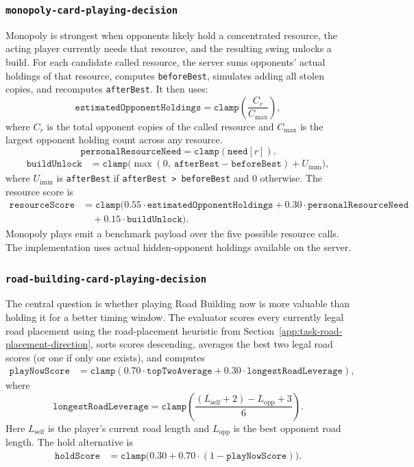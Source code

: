 \documentclass[letter,  12 pt]{article}
\begin{document}
\subsubsection{\texttt{monopoly-card-playing-decision}}
\label{app:task-monopoly-card-playing-decision}

Monopoly is strongest when opponents likely hold a concentrated resource, the acting player currently needs that resource, and the resulting swing unlocks a build.
For each candidate called resource, the server sums opponents' actual holdings of that resource, computes \texttt{beforeBest}, simulates adding all stolen copies, and recomputes \texttt{afterBest}. It then uses:
\[
\texttt{estimatedOpponentHoldings}
= \texttt{clamp}\left(\frac{C_r}{C_{\max}}\right),
\]
where $C_r$ is the total opponent copies of the called resource and $C_{\max}$ is the largest opponent holding count across any resource.
\[
\texttt{personalResourceNeed} = \texttt{clamp}(\texttt{need}[r]).
\]
\[
\begin{aligned}
\texttt{buildUnlock}
&= \texttt{clamp}\bigl(
\max(0,\ \texttt{afterBest} - \texttt{beforeBest}) + U_{\text{imm}}
\bigr),
\end{aligned}
\]
where $U_{\text{imm}}$ is \texttt{afterBest} if \texttt{afterBest > beforeBest} and $0$ otherwise.
The resource score is
\[
\begin{aligned}
\texttt{resourceScore}
&= \texttt{clamp}(
0.55 \cdot \texttt{estimatedOpponentHoldings}
+ 0.30 \cdot \texttt{personalResourceNeed} \\
&\quad + 0.15 \cdot \texttt{buildUnlock}).
\end{aligned}
\]
Monopoly plays emit a benchmark payload over the five possible resource calls. The implementation uses actual hidden-opponent holdings available on the server.

\subsubsection{\texttt{road-building-card-playing-decision}}
\label{app:task-road-building-card-playing-decision}
The central question is whether playing Road Building now is more valuable than holding it for a better timing window.
The evaluator scores every currently legal road placement using the road-placement heuristic from Section~\ref{app:task-road-placement-direction}, sorts scores descending, averages the best two legal road scores (or one if only one exists), and computes
\[
\begin{aligned}
\texttt{playNowScore}
&= \texttt{clamp}(
0.70 \cdot \texttt{topTwoAverage}
+ 0.30 \cdot \texttt{longestRoadLeverage}),
\end{aligned}
\]
where
\[
\texttt{longestRoadLeverage}
= \texttt{clamp}\left(\frac{(L_{\text{self}} + 2) - L_{\text{opp}} + 3}{6}\right).
\]
Here $L_{\text{self}}$ is the player's current road length and $L_{\text{opp}}$ is the best opponent road length.
The hold alternative is
\[
\begin{aligned}
\texttt{holdScore}
&= \texttt{clamp}\bigl(
0.30 + 0.70 \cdot (1 - \texttt{playNowScore})
\bigr).
\end{aligned}
\]
\end{document}
